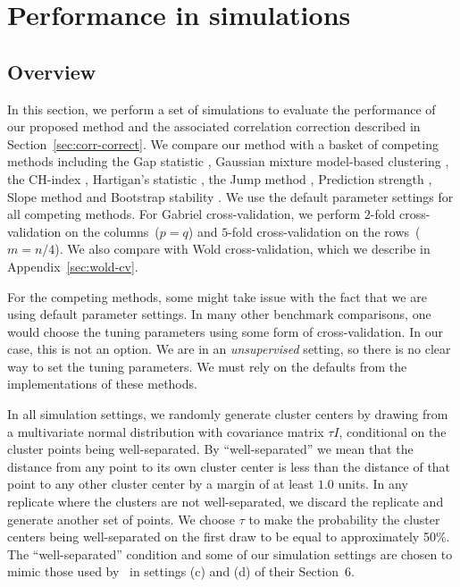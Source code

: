 \documentclass[12pt]{article}
\begin{document}
\section{Performance in simulations}
\label{sec:simulations}

\subsection{Overview}

In this section, we perform a set of simulations to evaluate the performance
of our proposed method and the associated correlation correction described in
Section~\ref{sec:corr-correct}.  We compare our method with a basket of
competing methods including the Gap statistic
\citep{tibshirani2001estimating}, Gaussian mixture model-based clustering
\citep{fraley2002model}, the CH-index \citep{calinski1974dendrite}, Hartigan's
statistic \citep{hartigan1975clustering}, the Jump method
\citep{sugar2003finding}, Prediction strength \citep{tibshirani2005cluster},
Slope method \citep{fujita2014non} and Bootstrap stability \citep{fang2012selection}. 
We use the default parameter settings for all competing methods.  For Gabriel cross-validation,
we perform $2$-fold cross-validation on the columns~($p=q$) and $5$-fold
cross-validation on the rows~($m=n/4$).  We also compare with Wold
cross-validation, which we describe in Appendix~\ref{sec:wold-cv}.


For the competing methods, some might take issue with the fact that we are
using default parameter settings.  In many other benchmark comparisons, one
would choose the tuning parameters using some form of cross-validation. In our
case, this is not an option. We are in an \emph{unsupervised} setting, so
there is no clear way to set the tuning parameters. We must rely on the
defaults from the implementations of these methods.


In all simulation settings, we randomly generate cluster centers by drawing
from a multivariate normal distribution with covariance matrix $\tau I$,
conditional on the cluster points being well-separated. By ``well-separated''
we mean that the distance from any point to its own cluster center is less
than the distance of that point to any other cluster center by a margin of
at least $1.0$ units. In any replicate where the clusters are not
well-separated, we discard the replicate and generate another set of points.
We choose $\tau$ to make the probability the cluster
centers being well-separated on the first draw to be equal to approximately
50\%.  The ``well-separated'' condition and some of our simulation settings
are chosen to mimic those used by~\cite{tibshirani2001estimating} in
settings (c) and (d) of their Section~6.
\end{document}
